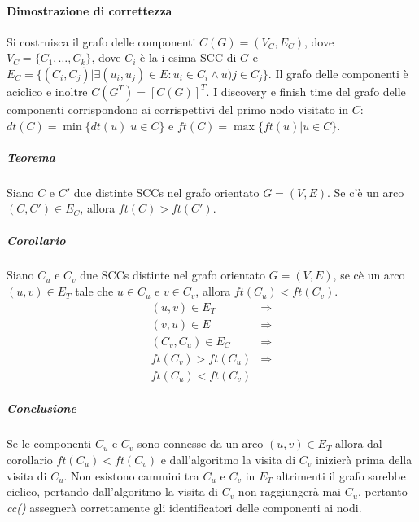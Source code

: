 \paragraph{Dimostrazione di correttezza}
Si costruisca il grafo delle componenti $C(G)=(V_C, E_C)$, dove $V_C=\{C_1, \dots, C_k\}$, dove $C_i$ \`e la i-esima SCC di $G$ e $E_C=\{(C_i, C_j)|\exists 
(u_i, u_j)\in E: u_i\in C_i\land u)j\in C_j\}$. Il grafo delle componenti \`e aciclico e inoltre $C(G^T)=[C(G)]^T$. I discovery e finish time del grafo 
delle componenti corrispondono ai corrispettivi del primo nodo visitato in $C$: $dt(C)=\min\{dt(u)|u\in C\}$ e $ft(C)=\max\{ft(u)|u\in C\}$.
\subparagraph{Teorema}
Siano $C$ e $C'$ due distinte SCCs nel grafo orientato $G=(V, E)$. Se c'\`e un arco $(C, C')\in E_C$, allora $ft(C)>ft(C')$.
\subparagraph{Corollario}
Siano $C_u$ e $C_v$ due SCCs distinte nel grafo orientato $G=(V, E)$, se c\`e un arco $(u, v)\in E_T$ tale che $u\in C_u$ e $v\in C_v$, allora $ft(C_u)<
ft(C_v)$. 
\begin{align*}
(u, v)\in E_T & \Rightarrow\\
(v, u)\in E & \Rightarrow\\
(C_v, C_u)\in E_C & \Rightarrow\\
ft(C_v)>ft(C_u) & \Rightarrow\\
ft(C_u)<ft(C_v) &
\end{align*}
\subparagraph{Conclusione}
Se le componenti $C_u$ e $C_v$ sono connesse da un arco $(u, v)\in E_T$ allora dal corollario $ft(C_u)<ft(C_v)$ e dall'algoritmo la visita di $C_v$ 
inizier\`a prima della visita di $C_u$. Non esistono cammini tra $C_u$ e $C_v$ in $E_T$ altrimenti il grafo sarebbe ciclico, pertando dall'algoritmo la
visita di $C_v$ non raggiunger\`a mai $C_u$, pertanto \emph{cc()} assegner\`a correttamente gli identificatori delle componenti ai nodi.